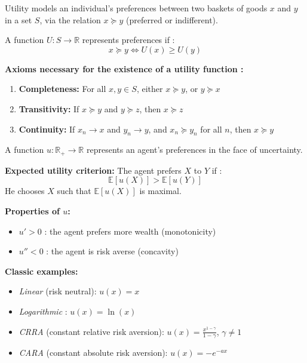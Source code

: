 \begin{f}
	Utility models an individual's preferences between two baskets of goods \(x\) and \(y\) in a set \(S\), via the relation \(x \succcurlyeq y\) (preferred or indifferent).
	
	A function \(U: S \rightarrow \mathbb{R}\) represents preferences if :
	\[
	x \succcurlyeq y \iff U(x) \geq U(y)
	\]
	
	\textbf{Axioms necessary for the existence of a utility function :}
	\begin{enumerate}
		\item \textbf{Completeness:} For all \(x, y \in S\), either \(x \succcurlyeq y\), or \(y \succcurlyeq x\)
		\item \textbf{Transitivity:} If \(x \succcurlyeq y\) and \(y \succcurlyeq z\), then \(x \succcurlyeq z\)
		\item \textbf{Continuity:} If \(x_n \to x\) and \(y_n \to y\), and \(x_n \succcurlyeq y_n\) for all \(n\), then \(x \succcurlyeq y\)
	\end{enumerate}
	
\end{f}


\begin{f}
	A function \(u : \mathbb{R}_+ \rightarrow \mathbb{R}\) represents an agent's preferences in the face of uncertainty.
	
	\textbf{Expected utility criterion:} The agent prefers \(X\) to \(Y\) if :
	\[
	\mathbb{E}[u(X)] > \mathbb{E}[u(Y)]
	\]
	He chooses \(X\) such that \(\mathbb{E}[u(X)]\) is maximal.
	
	\textbf{Properties of \(u\):}
	\begin{itemize}
		\item \(u'\! > 0\) : the agent prefers more wealth (monotonicity)
		\item \(u'' < 0\) : the agent is risk averse (concavity)
	\end{itemize}
	
	\textbf{Classic examples:}
	\begin{itemize}
		\item \textit{Linear} (risk neutral): \(u(x) = x\)
		\item \textit{Logarithmic} : \(u(x) = \ln(x)\)
		\item \textit{CRRA}  (constant relative risk aversion): \(u(x) = \frac{x^{1 - \gamma}}{1 - \gamma}\), \(\gamma \ne 1\)
		\item \textit{CARA}  (constant absolute risk aversion): \(u(x) = -e^{-a x}\)
	\end{itemize}
	
\end{f}


